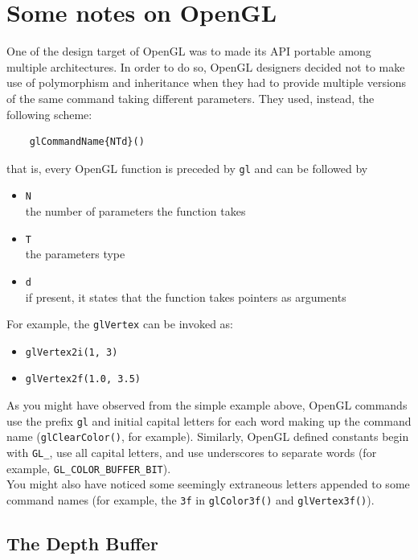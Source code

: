 \section{Some notes on OpenGL}
\label{opengl:opengl_notes}

One of the design target of OpenGL was to made its API portable 
among multiple architectures. In order to do so, OpenGL 
designers decided not to make use of polymorphism and inheritance 
when they had to provide multiple versions of the same command 
taking different parameters. They used, instead, the following scheme:

\begin{verbatim}
    glCommandName{NTd}()
\end{verbatim}

that is, every OpenGL function is preceded by \texttt{gl} and can be 
followed by

\begin{itemize}
  \item \texttt{N} \\
    the number of parameters the function takes
  \item \texttt{T} \\
    the parameters type
  \item \texttt{d} \\
    if present, it states that the function takes pointers as arguments
\end{itemize}

For example, the \texttt{glVertex} can be invoked as:

\begin{itemize}
\item \texttt{glVertex2i(1, 3)}
\item \texttt{glVertex2f(1.0, 3.5)}
\end{itemize}

As you might have observed from the simple example above,
OpenGL commands use the prefix \texttt{gl} and initial capital letters
for each word making up the command name (\texttt{glClearColor()}, for
example). Similarly, OpenGL defined constants begin with \texttt{GL\_}, use all
capital letters, and use underscores to separate words (for example,
\texttt{GL\_COLOR\_BUFFER\_BIT}).
\\
You might also have noticed some seemingly extraneous letters appended to
some command names (for example, the \texttt{3f} in
\texttt{glColor3f()} and \texttt{glVertex3f()}).

\subsection{The Depth Buffer}
\label{opengl:opengl_note:depth_buffer}


